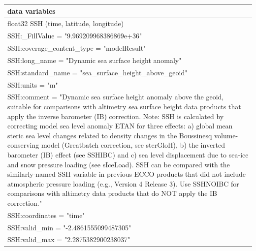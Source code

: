 \begin{longtable}{|p{\textwidth}|}
data variables\\
\hline
\hspace{0.5cm}float32 SSH (time, latitude, longitude)\\
\hspace{0.5cm}\hspace{0.5cm}SSH:\_FillValue = "9.969209968386869e+36"\\
\hspace{0.5cm}\hspace{0.5cm}SSH:coverage\_content\_type = "modelResult"\\
\hspace{0.5cm}\hspace{0.5cm}SSH:long\_name = "Dynamic sea surface height anomaly"\\
\hspace{0.5cm}\hspace{0.5cm}SSH:standard\_name = "sea\_surface\_height\_above\_geoid"\\
\hspace{0.5cm}\hspace{0.5cm}SSH:units = "m"\\
\hspace{0.5cm}\hspace{0.5cm}SSH:comment = "Dynamic sea surface height anomaly above the geoid, suitable for comparisons with altimetry sea surface height data products that apply the inverse barometer (IB) correction. Note: SSH is calculated by correcting model sea level anomaly ETAN for three effects: a) global mean steric sea level changes related to density changes in the Boussinesq volume-conserving model (Greatbatch correction, see sterGloH), b) the inverted barometer (IB) effect (see SSHIBC) and c) sea level displacement due to sea-ice and snow pressure loading (see sIceLoad). SSH can be compared with the similarly-named SSH variable in previous ECCO products that did not include atmospheric pressure loading (e.g., Version 4 Release 3). Use SSHNOIBC for comparisons with altimetry data products that do NOT apply the IB correction."\\
\hspace{0.5cm}\hspace{0.5cm}SSH:coordinates = "time"\\
\hspace{0.5cm}\hspace{0.5cm}SSH:valid\_min = "-2.4861555099487305"\\
\hspace{0.5cm}\hspace{0.5cm}SSH:valid\_max = "2.2875382900238037"\\

\end{longtable}
